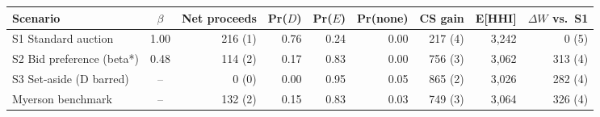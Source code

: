 \begin{tabular}{lcrrrrrrr}
\toprule
Scenario & $\beta$ & Net proceeds & Pr($D$) & Pr($E$) & Pr(none) & CS gain & E[HHI] & $\Delta W$ vs.\ S1 \\
\midrule
S1 Standard auction & 1.00 & 216 (1) & 0.76 & 0.24 & 0.00 & 217 (4) & 3,242 & 0 (5) \\
S2 Bid preference (beta*) & 0.48 & 114 (2) & 0.17 & 0.83 & 0.00 & 756 (3) & 3,062 & 313 (4) \\
S3 Set-aside (D barred) & -- & 0 (0) & 0.00 & 0.95 & 0.05 & 865 (2) & 3,026 & 282 (4) \\
Myerson benchmark & -- & 132 (2) & 0.15 & 0.83 & 0.03 & 749 (3) & 3,064 & 326 (4) \\
\bottomrule
\end{tabular}
